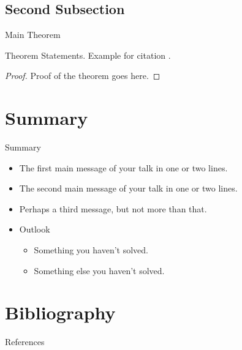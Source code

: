 \documentclass[xcolor=dvipsnames]{beamer}
\begin{document}
\subsection{Second Subsection}
\begin{frame}{Main Theorem}
    \begin{theorem}
        Theorem Statements. Example for citation \cite{Author1990}.
    \end{theorem}

    \begin{proof}
        Proof of the theorem goes here.
    \end{proof}
\end{frame}

\section*{Summary}

\begin{frame}{Summary}
    \begin{itemize}
        \item
            The \alert{first main message} of your talk in one or two lines.
        \item
            The \alert{second main message} of your talk in one or two lines.
        \item
            Perhaps a \alert{third message}, but not more than that.
    \end{itemize}

    \begin{itemize}
        \item
            Outlook
            \begin{itemize}
                \item
                    Something you haven't solved.
                \item
                    Something else you haven't solved.
            \end{itemize}
    \end{itemize}
\end{frame}

\section*{Bibliography}
\begin{frame}[allowframebreaks]{References}
    \footnotesize
    
    
\end{frame}
\end{document}
